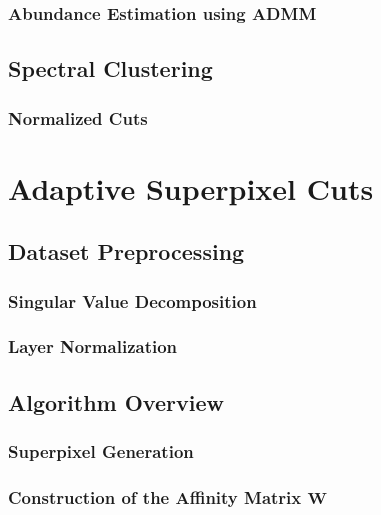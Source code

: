 \documentclass[10pt]{article}
\begin{document}
\subsubsection{Abundance Estimation using ADMM}\label{Block ADMM}

\clearpage
\subsection{Spectral Clustering} \label{Spectral Clustering}

\subsubsection{Normalized Cuts} \label{Normalized Cuts}


\clearpage
% 
% 
% 
% 
% 
\section{Adaptive Superpixel Cuts} \label{Algorithm Intro}

\subsection{Dataset Preprocessing} \label{Algorithm Preprocessing}
\subsubsection{Singular Value Decomposition} \label{SVD}
\subsubsection{Layer Normalization} \label{Normalization}

\clearpage
\subsection{Algorithm Overview} \label{Algorithm Overview}
\subsubsection{Superpixel Generation} \label{Algorithm Superpixels}
\subsubsection{Construction of the Affinity Matrix $\mathbf{W}$}\label{Algorithm Laplacian}
\end{document}
